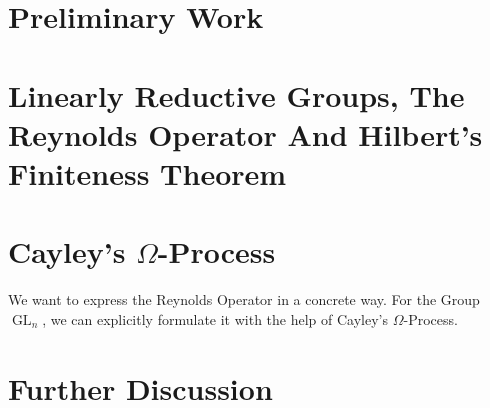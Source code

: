 \documentclass{article}
\theoremstyle{prrt}
\begin{document}
\section{Preliminary Work}\label{pw}

\bigskip



\section{Linearly Reductive Groups, The Reynolds Operator And Hilbert's Finiteness Theorem}



\section{Cayley's $\Omega$-Process}

We want to express the Reynolds Operator in a concrete way.
For the Group $\operatorname{GL}_n$, we can explicitly formulate it with the help of Cayley's $\Omega$-Process.



\section{Further Discussion}



% 
%
% 


\end{document}
